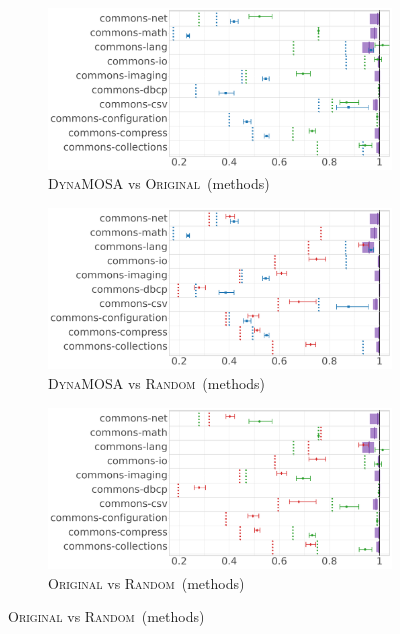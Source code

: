 \documentclass[sigconf]{acmart}
\newcommand{\original}{\textsc{Original}\xspace}
\newcommand{\EvosuiteRandom}{\textsc{Random}\xspace}
\newcommand{\EvosuiteDynamosa}{\textsc{DynaMOSA}\xspace}
\begin{document}
\begin{figure}
\begin{subfigure}{.43\textwidth}
    \centering
      \includegraphics[width=0.95\linewidth]{chaoplots/4/Chao-methods-dynamosa-organic.pdf}
  \caption{\textcolor{cdynamosa}\EvosuiteDynamosa vs \textcolor{coriginal}\original~(methods)}
\label{fig:am}
\end{subfigure}
\hfill
\begin{subfigure}{.28\textwidth}
    \centering
      \includegraphics[width=0.95\linewidth,trim=12.8cm 0cm 0cm 0cm, clip=true]{chaoplots/4/Chao-methods-dynamosa-random.pdf}
\caption{\textcolor{cdynamosa}\EvosuiteDynamosa vs \textcolor{crandom}\EvosuiteRandom~(methods)}
\label{fig:bm}
\end{subfigure}
\begin{subfigure}{.28\textwidth}
    \centering
      \includegraphics[width=0.95\linewidth,trim=12.8cm 0cm 0cm 0cm, clip=true]{chaoplots/4/Chao-methods-organic-random.pdf}
\caption{\textcolor{coriginal}\original vs \textcolor{crandom}\EvosuiteRandom~(methods)}
\label{fig:cm}
\end{subfigure}


\end{figure}
\end{document}
